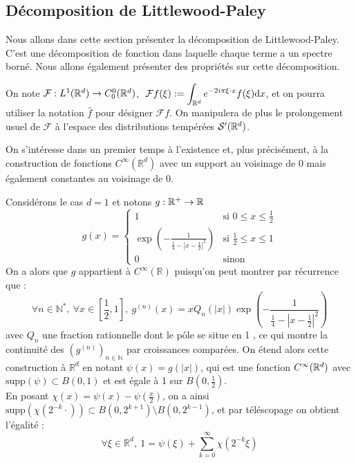 \documentclass[11pt,a4paper]{article}
\begin{document}
\subsection{Décomposition de Littlewood-Paley}
Nous allons dans cette section présenter la décomposition de Littlewood-Paley. C'est une décomposition de fonction dans laquelle chaque terme a un spectre borné. Nous allons également présenter des propriétés sur cette décomposition. 
\begin{defin}
On note $\mathcal{F} : L^1(\mathbb R^d) \to C^0_0(\mathbb R^d)$,  $\ \mathcal{F}f(\xi) := \displaystyle \int_{\mathbb R^d} e^{-2i\pi \xi \cdot x}f(\xi)\mathrm{d}x$, et on pourra utiliser la notation $\hat{f}$ pour désigner $\mathcal{F}f$. On manipulera de plus le prolongement usuel de $\mathcal{F}$ à l'espace des distributions tempérées $\mathcal{S}'(\mathbb R^d)$.
\end{defin}
On s'intéresse dans un premier temps à l'existence et, plus précisément, à la construction de fonctions $C^\infty(\mathbb{R}^d)$ avec un support au voisinage de 0 mais également constantes au voisinage de 0.

Considérons le cas $d=1$ et notons  $g: \mathbb R^+ \to \mathbb R$
\[ g(x) = \begin{cases} 
1 & \text{si } 0 \leq x \leq \frac{1}{2} \\
\exp\left(-\frac{1}{\frac{1}{4} - |x - \frac{1}{2}|^2}\right) & \text{si } \frac{1}{2} \leq x \leq 1 \\
0 & \text{sinon} \end{cases}
\]
On a alors que $g$ appartient à $C^\infty(\mathbb{R})$ puisqu'on peut montrer par récurrence que :
\begin{equation}\label{plateau}
\forall n \in \mathbb{N}^*, \ \forall x \in \left[\frac{1}{2}, 1\right], \ g^{(n)}(x) = x Q_n(|x|) \exp\left(-\frac{1}{\frac{1}{4} - |x - \frac{1}{2}|^2}\right)
\end{equation}
avec $Q_n$ une fraction rationnelle dont le pôle se situe en 1 , ce qui montre la continuité des $(g^{(n)})_{n \in \mathbb{N}}$ par croissances comparées. On étend alors cette construction à $\mathbb{R}^d$ en notant $\psi(x)=g(|x|)$, qui est une fonction $C^\infty(\mathbb R^d)$ avec $\text{supp}(\psi) \subset B(0,1)$ et est égale à 1 sur $B(0,\frac{1}{2})$. \\
En posant $\chi(x)=\psi(x)-\psi\left(\frac{x}{2}\right)$, on a ainsi $\text{supp}(\chi(2^{-k} \cdot)) \subset B(0,2^{k+1}) \setminus B(0,2^{k-1})$, et par téléscopage on obtient l'égalité  :
\begin{equation*}
 \forall \xi \in \mathbb{R}^d, \ 1= \psi(\xi) + \sum_{k=0}^\infty \chi(2^{-k} \xi)
\end{equation*}
\end{document}

